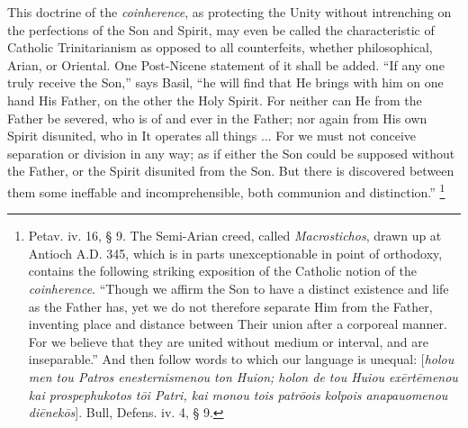 This doctrine of the \emph{coinherence}, as protecting the Unity
without intrenching on the perfections of the Son and Spirit, may even
be called the characteristic of Catholic Trinitarianism as opposed to
all counterfeits, whether philosophical, Arian, or Oriental. One
Post-Nicene statement of it shall be added. ``If any one truly
receive the Son,'' says Basil, ``he will find that He brings
with him on one hand His Father, on the other the Holy Spirit. For
neither can He from the Father be severed, who is of and ever in the
Father; nor again from His own Spirit disunited, who in It operates
all things ... For we must not conceive separation or division in any
way; as if either the Son could be supposed without the Father, or the
Spirit disunited from the Son. But there is discovered between them
some ineffable and incomprehensible, both communion and
distinction.'' \footnote{Petav. iv. 16, § 9. The Semi-Arian creed,
called \emph{Macrostichos}, drawn up at Antioch A.D.
345, which is in parts unexceptionable in point of orthodoxy, contains
the following striking exposition of the Catholic notion of the \emph{coinherence}.
``Though we affirm the Son to have a distinct existence and life
as the Father has, yet we do not therefore separate Him from the
Father, inventing place and distance between Their union after a
corporeal manner. For we believe that they are united without medium
or interval, and are inseparable.'' And then follow words to which
our language is unequal: [\emph{holou men tou Patros enesternismenou ton
Huion; holon de tou Huiou ex\={e}rt\={e}menou kai prospephukotos
t\={o}i Patri, kai monou tois patr\={o}ois kolpois anapauomenou
di\={e}nek\={o}s}]. Bull, Defens. iv. 4, § 9.}

